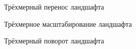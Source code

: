 \begin{figure}
	\caption{Трёхмерный перенос ландшафта}
	\label{move}
\end{figure}

\begin{figure}
	\caption{Трёхмерное масштабирование ландшафта}
	\label{scale}
\end{figure}

\begin{figure}
	\caption{Трёхмерный поворот ландшафта}
	\label{rotate}
\end{figure}

